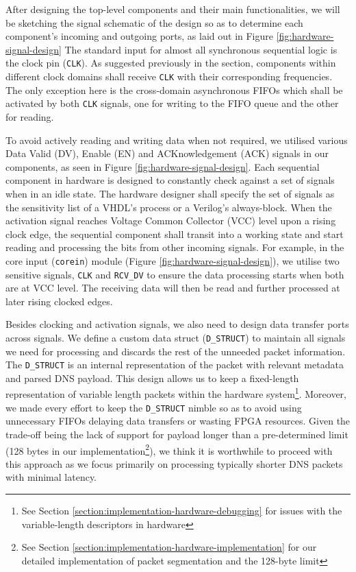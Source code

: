 \documentclass[a4paper]{report}
\newcommand{\proglang}{\textsf}
\newcommand{\code}{\texttt}
\begin{document}
After designing the top-level components and their main functionalities, we will be sketching the signal schematic of the design so as to determine each component's incoming and outgoing ports, as laid out in Figure \ref{fig:hardware-signal-design} The standard input for almost all synchronous sequential logic is the clock pin (\code{CLK}). As suggested previously in the section, components within different clock domains shall receive \code{CLK} with their corresponding frequencies. The only exception here is the cross-domain asynchronous FIFOs which shall be activated by both \code{CLK} signals, one for writing to the FIFO queue and the other for reading.

To avoid actively reading and writing data when not required, we utilised various Data Valid (DV), Enable (EN) and ACKnowledgement (ACK) signals in our components, as seen in Figure \ref{fig:hardware-signal-design}. Each sequential component in hardware is designed to constantly check against a set of signals when in an idle state. The hardware designer shall specify the set of signals as the sensitivity list of a \proglang{VHDL}'s process or a \proglang{Verilog}'s always-block. When the activation signal reaches Voltage Common Collector (VCC) level upon a rising clock edge, the sequential component shall transit into a working state and start reading and processing the bits from other incoming signals. For example, in the core input (\code{corein}) module (Figure \ref{fig:hardware-signal-design}), we utilise two sensitive signals, \code{CLK} and \code{RCV\_DV} to ensure the data processing starts when both are at VCC level. The receiving data will then be read and further processed at later rising clocked edges.

Besides clocking and activation signals, we also need to design data transfer ports across signals. We define a custom data struct (\code{D\_STRUCT}) to maintain all signals we need for processing and discards the rest of the unneeded packet information. The \code{D\_STRUCT} is an internal representation of the packet with relevant metadata and parsed DNS payload. This design allows us to keep a fixed-length representation of variable length packets within the hardware system\footnote{See Section \ref{section:implementation-hardware-debugging} for issues with the variable-length descriptors in hardware}. Moreover, we made every effort to keep the \code{D\_STRUCT} nimble so as to avoid using unnecessary FIFOs delaying data transfers or wasting FPGA resources. Given the trade-off being the lack of support for payload longer than a pre-determined limit (128 bytes in our implementation\footnote{See Section \ref{section:implementation-hardware-implementation} for our detailed implementation of packet segmentation and the 128-byte limit}), we think it is worthwhile to proceed with this approach as we focus primarily on processing typically shorter DNS packets with minimal latency.
\end{document}
